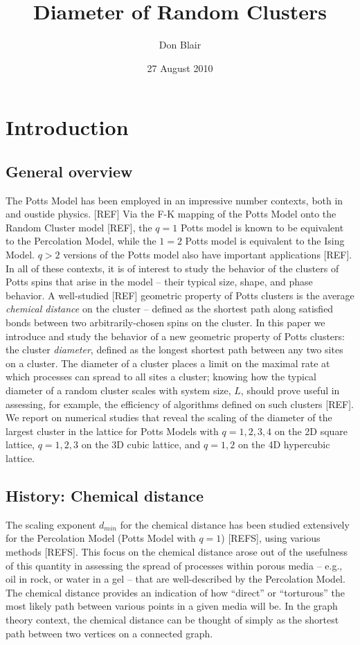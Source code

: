\documentclass{article}
\title{Diameter of Random Clusters}
\author{Don Blair}
\date{27 August 2010}
\begin{document}
\setcounter{tocdepth}{5}
\tableofcontents
\vspace*{1cm}
\section{Introduction}
\label{sec-1}
\subsection{General overview}
\label{sec-1.1}

The Potts Model has been employed in an impressive number contexts, both in and oustide physics. [REF] Via the F-K mapping of the Potts Model onto the Random Cluster model [REF], the $q=1$ Potts model is known to be equivalent to the Percolation Model, while the $1=2$ Potts model is equivalent to the Ising Model.
$q>2$ versions of the Potts model also have important applications [REF]. In all of these contexts, it is of interest to study the behavior of the clusters of Potts spins that arise in the model -- their typical size, shape, and phase behavior.  A well-studied [REF]
geometric property of Potts clusters is the average \emph{chemical distance} on the cluster -- defined as the shortest path along satisfied bonds between two arbitrarily-chosen spins on the cluster.  
In this paper we introduce and study the behavior of a new geometric property of Potts clusters: the cluster \emph{diameter}, defined as the longest shortest path between any two sites on a cluster.  The diameter of a cluster places a limit on the maximal rate at which processes can spread to all sites a cluster; knowing how the typical diameter of a random cluster scales with system size, $L$, should prove useful in assessing, for example, the efficiency of algorithms defined on such clusters [REF]. 
We report on numerical studies that reveal the scaling of the diameter of the largest cluster in the lattice for Potts Models with $q=1,2,3,4$ on the 2D square lattice, $q=1,2,3$ on the 3D cubic lattice, and $q=1,2$ on the 4D hypercubic lattice.
\subsection{History: Chemical distance}
\label{sec-1.2}

The scaling exponent $d_{min}$ for the chemical distance has been studied extensively for the Percolation Model (Potts Model with $q=1$) [REFS], using various methods [REFS].  
This focus on the chemical distance arose out of the usefulness of this quantity in assessing the spread of processes within porous media -- e.g., oil in rock, or water in a gel -- that are well-described by the Percolation Model. The chemical distance provides an indication of how ``direct'' or ``torturous'' the most likely path between various points in a given media will be. In the graph theory context, the chemical distance can be thought of simply as the shortest path between two vertices on a connected graph.
\end{document}

